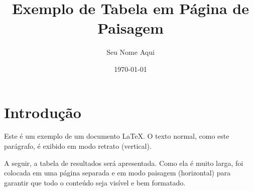 \documentclass[12pt, a4paper]{article}
\title{Exemplo de Tabela em Página de Paisagem}
\author{Seu Nome Aqui}
\date{\today}
\begin{document}
\maketitle

\section{Introdução}
Este é um exemplo de um documento LaTeX. O texto normal, como este parágrafo, é exibido em modo retrato (vertical).

A seguir, a tabela de resultados será apresentada. Como ela é muito larga, foi colocada em uma página separada e em modo paisagem (horizontal) para garantir que todo o conteúdo seja visível e bem formatado.


\end{document}
